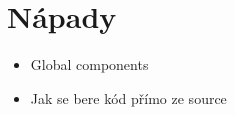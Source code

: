 
\chapter{Nápady}

\begin{itemize}
    \item Global components
    \item Jak se bere kód přímo ze source
\end{itemize}
